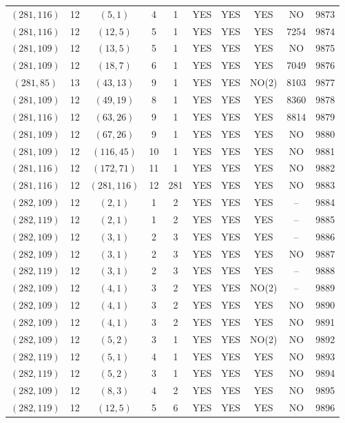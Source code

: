 \begin{longtable}{|c|c|c|c|c|c|c|c|c|c|}
$(281, 116)$ & 12 & $(5, 1)$ & 4 & 1 & YES & YES & YES & NO & 9873\\
$(281, 116)$ & 12 & $(12, 5)$ & 5 & 1 & YES & YES & YES & 7254 & 9874\\
$(281, 109)$ & 12 & $(13, 5)$ & 5 & 1 & YES & YES & YES & NO & 9875\\
$(281, 109)$ & 12 & $(18, 7)$ & 6 & 1 & YES & YES & YES & 7049 & 9876\\
$(281, 85)$ & 13 & $(43, 13)$ & 9 & 1 & YES & YES & NO(2) & 8103 & 9877\\
$(281, 109)$ & 12 & $(49, 19)$ & 8 & 1 & YES & YES & YES & 8360 & 9878\\
$(281, 116)$ & 12 & $(63, 26)$ & 9 & 1 & YES & YES & YES & 8814 & 9879\\
$(281, 109)$ & 12 & $(67, 26)$ & 9 & 1 & YES & YES & YES & NO & 9880\\
$(281, 109)$ & 12 & $(116, 45)$ & 10 & 1 & YES & YES & YES & NO & 9881\\
$(281, 116)$ & 12 & $(172, 71)$ & 11 & 1 & YES & YES & YES & NO & 9882\\
$(281, 116)$ & 12 & $(281, 116)$ & 12 & 281 & YES & YES & YES & NO & 9883\\
$(282, 109)$ & 12 & $(2, 1)$ & 1 & 2 & YES & YES & YES & -- & 9884\\
$(282, 119)$ & 12 & $(2, 1)$ & 1 & 2 & YES & YES & YES & -- & 9885\\
$(282, 109)$ & 12 & $(3, 1)$ & 2 & 3 & YES & YES & YES & -- & 9886\\
$(282, 109)$ & 12 & $(3, 1)$ & 2 & 3 & YES & YES & YES & NO & 9887\\
$(282, 119)$ & 12 & $(3, 1)$ & 2 & 3 & YES & YES & YES & -- & 9888\\
$(282, 109)$ & 12 & $(4, 1)$ & 3 & 2 & YES & YES & NO(2) & -- & 9889\\
$(282, 109)$ & 12 & $(4, 1)$ & 3 & 2 & YES & YES & YES & NO & 9890\\
$(282, 109)$ & 12 & $(4, 1)$ & 3 & 2 & YES & YES & YES & NO & 9891\\
$(282, 109)$ & 12 & $(5, 2)$ & 3 & 1 & YES & YES & NO(2) & NO & 9892\\
$(282, 119)$ & 12 & $(5, 1)$ & 4 & 1 & YES & YES & YES & NO & 9893\\
$(282, 119)$ & 12 & $(5, 2)$ & 3 & 1 & YES & YES & YES & NO & 9894\\
$(282, 109)$ & 12 & $(8, 3)$ & 4 & 2 & YES & YES & YES & NO & 9895\\
$(282, 119)$ & 12 & $(12, 5)$ & 5 & 6 & YES & YES & YES & NO & 9896\\

\end{longtable}
